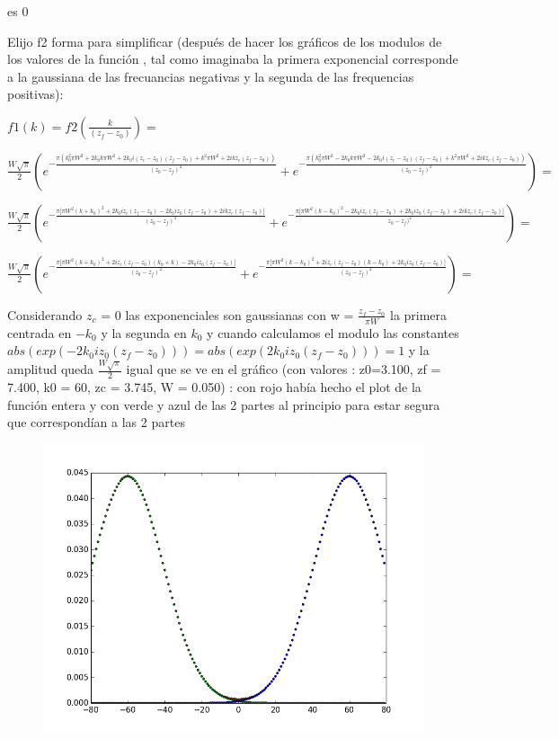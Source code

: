 \documentclass{article}
\begin{document}
es 0


Elijo f2 forma para simplificar (después de hacer los gráficos de los modulos de los valores de la función , tal como imaginaba la primera exponencial corresponde a la gaussiana de las frecuancias negativas y la segunda de las frequencias positivas):


$f1(k) = f2(\frac{k}{(z_f - z_0)}) = $

$ \frac{W \sqrt{\pi}}{2}  (e^{-\frac{\pi (k_0^2 \pi  W^2 + 2 k_0 k \pi W^2 + 2 k_0 i  (z_c - z_0) (z_f-z_0)+k^2 \pi W^2 +
2 i k z_c (z_f - z_0))}{(z_0-z_f)^2}}+e^{-\frac{\pi  (k_0^2 \pi  W^2 - 2 k_0 k \pi  W^2 - 2 k_0 i (z_c - z_0) (z_f-z_0)+k^2 \pi  W^2+2 i k z_c (z_f - z_0))}{(z_0-z_f)^2}}) =
$

$ \frac{W \sqrt{\pi}}{2}  (e^{-\frac{\pi \big[ \pi  W^2 (k + k_0)^2   + 2 k_0 i z_c(z_f - z_0)   - 2 k_0 i z_0 (z_f-z_0) +
2 i k z_c (z_f - z_0)\big]}{(z_0-z_f)^2}}+e^{-\frac{\pi \big[\pi  W^2 (k - k_0)^2  -2 k_0 i z_c(z_f - z_0)  + 2 k_0 i z_0 (z_f-z_0)+2 i k z_c (z_f - z_0)\big]}{z_0-z_f)^2}}) =
$

$ \frac{W \sqrt{\pi}}{2}  (e^{-\frac{\pi \big[ \pi  W^2 (k + k_0)^2   + 2  i z_c(z_f - z_0)(k_0 + k)   - 2 k_0 i z_0 (z_f-z_0) \big]}{(z_0-z_f)^2}}+e^{-\frac{\pi \big[\pi  W^2 (k - k_0)^2  +2 i z_c(z_f - z_0)(k - k_0)  + 2 k_0 i z_0 (z_f-z_0)\big]}{(z_0-z_f)^2}}) =
$

Considerando $z_c$ = 0 
las exponenciales son  gaussianas  con w = $\frac{z_f - z_0}{\pi W}$ la primera centrada en $-k_0$ y la segunda en $k_0$
y cuando calculamos el modulo las constantes $ abs(exp( - 2 k_0 i z_0 (z_f-z_0))) = abs(exp( 2 k_0 i z_0 (z_f-z_0)))  = 1$
y la amplitud queda $\frac{W \sqrt{\pi}}{2}$ igual que se ve en el gráfico (con valores :  z0=3.100, zf = 7.400, k0 = 60, zc = 3.745, W = 0.050) : con rojo había hecho el plot de la función entera y con verde y azul de las 2 partes al principio para estar segura que correspondían a las 2 partes

\begin{figure}[!ht] 
 \centering 
 \includegraphics[scale=0.5]{gauss.png} 
\end{figure} 
 
\end{document}

